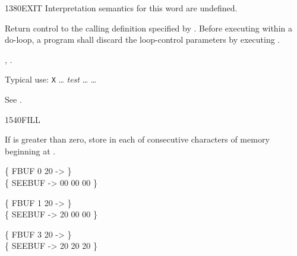 \begin{worddef}{1380}{EXIT}
\interpret
	Interpretation semantics for this word are undefined.

\execute
	\stack{}{}

	Return control to the calling definition specified by
	. Before executing  within a
	do-loop, a program shall discard the loop-control parameters
	by executing .

\see {},
	.

	\begin{defer}
	\rationale %
		Typical use:
			\word{:} \texttt{X} {\ldots}
				\emph{test} 
				{\ldots}  
			{\ldots} \word{;}

	\testing\rmfamily
		See .
	\end{defer}
\end{worddef}


\begin{worddef}{1540}{FILL}
\item {}

	If  is greater than zero, store  in each of
	 consecutive characters of memory beginning at
	\param{c-addr}.

	\begin{defer}
	\testing
		\{ FBUF 0 20  -> \} \\
		\{ SEEBUF -> 00 00 00 \}

		\{ FBUF 1 20  -> \} \\
		\{ SEEBUF -> 20 00 00 \}

		\{ FBUF 3 20  -> \} \\
		\{ SEEBUF -> 20 20 20 \}
	\end{defer}
\end{worddef}


